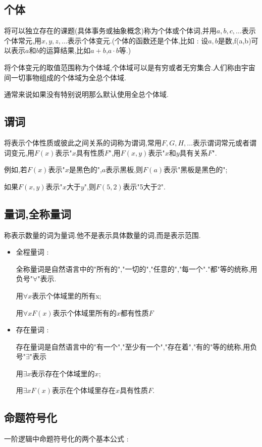 {{\subsection{个体}{
  将可以独立存在的课题(具体事务或抽象概念)称为个体或个体词,并用$a,b,c,\dots$表示个体常元,用$x,y,z,\dots$表示个体变元.(个体的函数还是个体,比如 : 设$a,b$是数,f(a,b)可以表示$a$和$b$的运算结果,比如$a + b$,$a \cdot b$等.)

  将个体变元的取值范围称为个体域,个体域可以是有穷或者无穷集合.人们称由宇宙间一切事物组成的个体域为全总个体域.

  通常来说如果没有特别说明那么默认使用全总个体域.
}%

\subsection{谓词}{
  将表示个体性质或彼此之间关系的词称为谓词,常用$F,G,H,\dots$表示谓词常元或者谓词变元,用$F(x)$表示"$x$具有性质$F$",用$F(x,y)$表示"$x$和$y$具有关系$F$".

  例如,若$F(x)$表示"$x$是黑色的",$a$表示黑板,则$F(a)$表示"黑板是黑色的";

  如果$F(x,y)$表示"$x$大于$y$",则$F(5,2)$表示"5大于2".
}%

\subsection{量词,全称量词}{
  称表示数量的词为量词.他不是表示具体数量的词,而是表示范围.

  \begin{itemize}
    \item {
          全程量词 :

          全称量词是自然语言中的"所有的","一切的","任意的","每一个"."都"等的统称,用负号"$\forall$"表示.

          用$\forall x$表示个体域里的所有x;

          用$\forall x F(x)$表示个体域里所有的$x$都有性质$F$
          }
    \item {
          存在量词 :

          存在量词是自然语言中的"有一个","至少有一个","存在着","有的"等的统称,用负号"$\exists$"表示

          用$\exists x$表示存在个体域里的$x$;

          用$\exists x F(x)$表示在个体域里存在$x$具有性质$F$.
          }
  \end{itemize}
}%

\subsection{命题符号化}{
  一阶逻辑中命题符号化的两个基本公式 :

}}}
